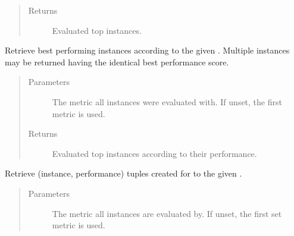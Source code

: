 \documentclass[letterpaper,10pt,english]{sphinxmanual}
\begin{document}
\begin{fulllineitems}
\begin{fulllineitems}
\begin{quote}
\begin{description}
\item[{Returns}] \leavevmode
\sphinxAtStartPar
Evaluated top  instances.

\end{description}\end{quote}

\end{fulllineitems}


\begin{fulllineitems}
\label{\detokenize{pusion.evaluation.evaluation:pusion.evaluation.evaluation.Evaluation.get_top_instances}}
\sphinxAtStartPar
Retrieve best performing instances according to the given .
Multiple instances may be returned having the identical best performance score.
\begin{quote}\begin{description}
\item[{Parameters}] \leavevmode
\sphinxAtStartPar
{} \textendash{} The metric all instances were evaluated with. If unset, the first metric is used.

\item[{Returns}] \leavevmode
\sphinxAtStartPar
Evaluated top instances according to their performance.

\end{description}\end{quote}

\end{fulllineitems}


\begin{fulllineitems}
\label{\detokenize{pusion.evaluation.evaluation:pusion.evaluation.evaluation.Evaluation.get_instance_performance_tuples}}
\sphinxAtStartPar
Retrieve (instance, performance) tuples created for to the given .
\begin{quote}\begin{description}
\item[{Parameters}] \leavevmode
\sphinxAtStartPar
{} \textendash{} The metric all instances are evaluated by. If unset, the first set metric is used.


\end{description}
\end{quote}
\end{fulllineitems}
\end{fulllineitems}
\end{document}
